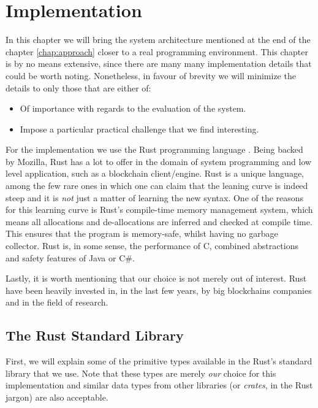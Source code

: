 \chapter{Implementation}

In this chapter we will bring the system architecture mentioned at the end of the chapter
\ref{chap:approach} closer to a real programming environment. This chapter is by no means extensive,
since there are many many implementation details that could be worth noting. Nonetheless, in favour
of brevity we will minimize the details to only those that are either of:

\begin{itemize}
	\item Of importance with regards to the evaluation of the system.
	\item Impose a particular practical challenge that we find interesting.
\end{itemize}

For the implementation we use the Rust programming language
\cite{klabnikRustProgrammingLanguage2019}. Being backed by Mozilla, Rust has a lot to offer in the
domain of system programming and low level application, such as a blockchain client/engine. Rust is
a unique language, among the few rare ones in which one can claim that the leaning curve is indeed
steep and it is \textit{not} just a matter of learning the new syntax. One of the reasons for this
learning curve is Rust's compile-time memory management system, which means all allocations and
de-allocations are inferred and checked at compile time. This ensures that the program is
memory-safe, whilst having no garbage collector. Rust is, in some sense, the performance of C,
combined abstractions and safety features of Java or C\#\cite{jungRustBeltSecuringFoundations2017}.

Lastly, it is worth mentioning that our choice is not merely out of interest. Rust have been heavily
invested in, in the last few years, by big blockchains companies and in the field of
research\cite{RustBlockchain}.

\section{The Rust Standard Library}

First, we will explain some of the primitive types available in the Rust's standard library that we
use. Note that these types are merely \textit{our} choice for this implementation and similar data
types from other libraries (or \textit{crates}, in the Rust jargon) are also acceptable.

